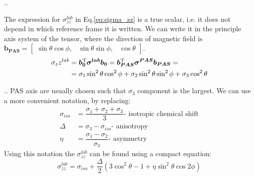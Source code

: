 \documentclass{beamer}
\begin{document}
\begin{frame}{\thesection.\thesubsection. \insertsubsection}
   
   
   The expression for $\sigma_{zz}^{lab}$ in Eq.\ref{eq:sigma_zz} is a true scalar, i.e. it does not depend in which reference frame it is written. We can write it in the principle axis system of the tensor, where the direction of magnetic field is $\bm{b_{PAS}} = \begin{bmatrix} \sin \theta \cos \phi, & \sin \theta \sin \phi,   & \cos \theta \end{bmatrix}  $.
   \begin{align}
      \sigma_zz^{lab} &= \bm{b_0}^{\rm T} \bm{\sigma^{lab}} \bm{b_0} = \bm{b_{PAS}}^{\rm T} \bm{\sigma^{PAS}} \bm{b_{PAS}} = \\
      &= \sigma_1 \sin^2 \theta \cos^2 \phi + \sigma_2 \sin^2 \theta \sin^2 \phi + \sigma_3 \cos^2 \theta 
   \end{align}

\end{frame}   
\begin{frame}{\thesection.\thesubsection. \insertsubsection}
    PAS axis are usually chosen such that  $\sigma_3$ component is the largest. We can use a more convenient notation, by replacing:
    \begin{align}
       \sigma_{iso} &= \dfrac{\sigma_1  + \sigma_2 + \sigma_3}{3}  \text{- isotropic chemical shift} \\
       \Delta &= \sigma_3 - \sigma_{iso} \text{- anisotropy} \\
       \eta &= \dfrac{\sigma_1 - \sigma_2}{\sigma_3} \text{- asymmetry}
    \end{align}
    Using this notation the $\sigma_{zz}^{lab}$ can be found using a compact equation:
    \begin{equation}
       \sigma_{zz}^{lab} = \sigma_{iso} + \dfrac{\Delta}{2}(3 \cos^2 \theta -1 + \eta \sin^2 \theta \cos 2 \phi)
    \end{equation}
\end{frame}
\end{document}
